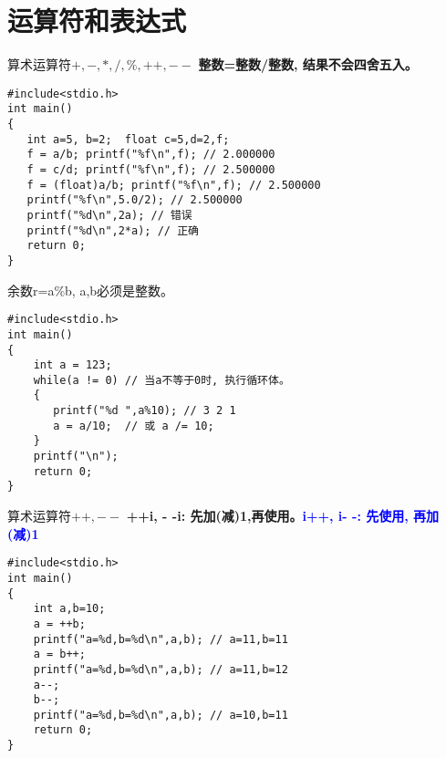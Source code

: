 
\section{运算符和表达式}

\begin{frame}[fragile]{算术运算符$+, -, *, /, \%, ++, --$}
\textbf{整数=整数/整数, 结果不会四舍五入。}
\begin{lstlisting}
#include<stdio.h>           
int main()                   
{                            
   int a=5, b=2;  float c=5,d=2,f;
   f = a/b; printf("%f\n",f); // 2.000000
   f = c/d; printf("%f\n",f); // 2.500000
   f = (float)a/b; printf("%f\n",f); // 2.500000
   printf("%f\n",5.0/2); // 2.500000
   printf("%d\n",2a); // 错误
   printf("%d\n",2*a); // 正确
   return 0;           
}                            
\end{lstlisting}
\end{frame}

\begin{frame}[fragile]{余数r=a\%b, a,b必须是整数。}
\begin{lstlisting}
#include<stdio.h>           
int main()                   
{                            
    int a = 123;
    while(a != 0) // 当a不等于0时, 执行循环体。
    {
       printf("%d ",a%10); // 3 2 1
       a = a/10;  // 或 a /= 10;
    }
    printf("\n");
    return 0;           
}                            
\end{lstlisting}
\end{frame}

\begin{frame}[fragile]{算术运算符$++,--$}
\textbf{++i, - -i: 先加(减)1,再使用。}\textcolor{blue}{\textbf{i++, i- -: 先使用, 再加(减)1}}
\begin{lstlisting}
#include<stdio.h>           
int main()                   
{                            
    int a,b=10;
    a = ++b;
    printf("a=%d,b=%d\n",a,b); // a=11,b=11  
    a = b++;
    printf("a=%d,b=%d\n",a,b); // a=11,b=12
    a--;
    b--;
    printf("a=%d,b=%d\n",a,b); // a=10,b=11
    return 0;           
}                            
\end{lstlisting}
\end{frame}

